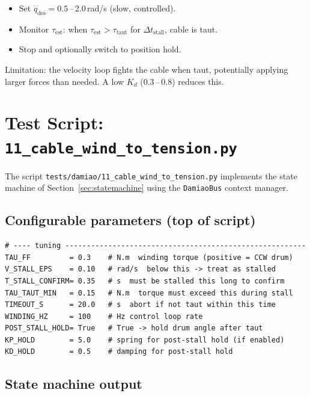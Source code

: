 \documentclass[11pt,a4paper]{article}
\begin{document}
\begin{itemize}
  \item Set $\dot q_\text{des} = 0.5$\,--\,2.0\,rad/s (slow, controlled).
  \item Monitor $\tau_\text{est}$: when $\tau_\text{est} > \tau_\text{taut}$
        for $\Delta t_\text{stall}$, cable is taut.
  \item Stop and optionally switch to position hold.
\end{itemize}

Limitation: the velocity loop fights the cable when taut, potentially
applying larger forces than needed.  A low $K_d$ (0.3\,--\,0.8) reduces this.

\section{Test Script: \texttt{11\_cable\_wind\_to\_tension.py}}
\label{sec:testscript}

The script \texttt{tests/damiao/11\_cable\_wind\_to\_tension.py} implements
the state machine of Section~\ref{sec:statemachine} using the
\texttt{DamiaoBus} context manager.

\subsection{Configurable parameters (top of script)}

\begin{lstlisting}
# ---- tuning --------------------------------------------------------
TAU_FF         = 0.3    # N.m  winding torque (positive = CCW drum)
V_STALL_EPS    = 0.10   # rad/s  below this -> treat as stalled
T_STALL_CONFIRM= 0.35   # s  must be stalled this long to confirm
TAU_TAUT_MIN   = 0.15   # N.m  torque must exceed this during stall
TIMEOUT_S      = 20.0   # s  abort if not taut within this time
WINDING_HZ     = 100    # Hz control loop rate
POST_STALL_HOLD= True   # True -> hold drum angle after taut
KP_HOLD        = 5.0    # spring for post-stall hold (if enabled)
KD_HOLD        = 0.5    # damping for post-stall hold
\end{lstlisting}

\subsection{State machine output}
\end{document}
